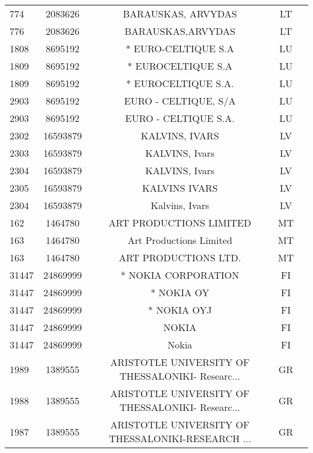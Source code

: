 \begin{longtable}{|l|c|c|c|c|}
       774 &    2083626 &                                 BARAUSKAS, ARVYDAS &      LT \\
       776 &    2083626 &                                  BARAUSKAS,ARVYDAS &      LT \\
      1808 &    8695192 &                                * EURO-CELTIQUE S.A &      LU \\
      1809 &    8695192 &                                 * EUROCELTIQUE S.A &      LU \\
      1809 &    8695192 &                                * EUROCELTIQUE S.A. &      LU \\
      2903 &    8695192 &                               EURO - CELTIQUE, S/A &      LU \\
      2903 &    8695192 &                               EURO - CELTIQUE S.A. &      LU \\
      2302 &   16593879 &                                     KALVINS, IVARS &      LV \\
      2303 &   16593879 &                                     KALVINS, Ivars &      LV \\
      2304 &   16593879 &                                     KALVINS, Ivars &      LV \\
      2305 &   16593879 &                                      KALVINS IVARS &      LV \\
      2304 &   16593879 &                                     Kalvins, Ivars &      LV \\
       162 &    1464780 &                            ART PRODUCTIONS LIMITED &      MT \\
       163 &    1464780 &                            Art Productions Limited &      MT \\
       163 &    1464780 &                               ART PRODUCTIONS LTD. &      MT \\
     31447 &   24869999 &                                * NOKIA CORPORATION &      FI \\
     31447 &   24869999 &                                         * NOKIA OY &      FI \\
     31447 &   24869999 &                                        * NOKIA OYJ &      FI \\
     31447 &   24869999 &                                              NOKIA &      FI \\
     31447 &   24869999 &                                              Nokia &      FI \\
      1989 &    1389555 &  ARISTOTLE UNIVERSITY OF THESSALONIKI-  Researc... &      GR \\
      1988 &    1389555 &  ARISTOTLE UNIVERSITY OF THESSALONIKI-  Researc... &      GR \\
      1987 &    1389555 &  ARISTOTLE UNIVERSITY OF THESSALONIKI-RESEARCH ... &      GR \\
\hline
\end{longtable}
